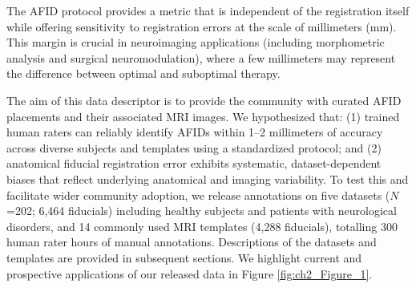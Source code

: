 The AFID protocol provides a metric that is independent of the registration itself while offering sensitivity to registration errors at the scale of millimeters (mm). This margin is crucial in neuroimaging applications (including morphometric analysis and surgical neuromodulation), where a few millimeters may represent the difference between optimal and suboptimal therapy.


 
The aim of this data descriptor is to provide the community with curated AFID placements and their associated MRI images. We hypothesized that: (1) trained human raters can reliably identify AFIDs within 1–2 millimeters of accuracy across diverse subjects and templates using a standardized protocol; and (2) anatomical fiducial registration error exhibits systematic, dataset-dependent biases that reflect underlying anatomical and imaging variability. To test this and facilitate wider community adoption, we release annotations on five datasets (\(N\)=202; 6,464 fiducials) including healthy subjects and patients with neurological disorders, and 14 commonly used MRI templates (4,288 fiducials), totalling 300 human rater hours of manual annotations. Descriptions of the datasets and templates are provided in subsequent sections. We highlight current and prospective applications of our released data in Figure \ref{fig:ch2_Figure_1}.

